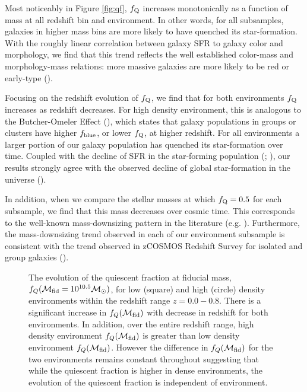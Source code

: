 \documentclass{emulateapj}
\begin{document}
Most noticeably in Figure \ref{fig:qf}, $f_{\rm{Q}}$ increases monotonically as a function of mass at all redshift bin and environment. In other words, for all subsamples, galaxies in higher mass bins are more likely to have quenched its star-formation. With the roughly linear correlation between galaxy SFR to galaxy color and morphology, we find that this trend reflects the well established color-mass and morphology-mass relations: more massive galaxies are more likely to be red or early-type (\cite{blanton09a}). 

Focusing on the redshift evolution of $f_{\rm{Q}}$, we find that for both environments $f_{\rm{Q}}$ increases as redshift decreases. For high density environment, this is analogous to the Butcher-Omeler Effect (\cite{Butcher:1984aa}), which states that galaxy populations in groups or clusters have higher $f_{\rm{blue}}$, or lower $f_{\rm{Q}}$, at higher redshift. For all environments a larger portion of our galaxy population has quenched its star-formation over time. Coupled with the decline of SFR in the star-forming population (\cite{Noeske:2007aa}; \cite{cooper08a}), our results strongly agree with the observed decline of global star-formation in the universe (\cite{hopkins06a}). %

In addition, when we compare the stellar masses at which $f_{\rm{Q}} = 0.5$ for each subsample, we find that this mass decreases over cosmic time. This corresponds to the well-known mass-downsizing pattern in the literature (e.g. \cite{bundy06a}). Furthermore, the mass-downsizing trend observed in each of our environment subsample is consistent with the trend observed in zCOSMOS Redshift Survey for isolated and group galaxies (\cite{Iovino:2010aa}). %

\begin{figure}
    \begin{center}
        \leavevmode
        \caption{The evolution of the quiescent fraction at fiducial mass, $f_{Q}(\mathcal{M}_{\rm{fid}} = 10^{10.5} \mathcal{M}_\odot)$, for low (square) and high (circle) density environments within the redshift range $z = 0.0 - 0.8$.  There is a significant increase in $f_{Q}(\mathcal{M}_{\rm{fid}})$ with decrease in redshift for both environments. In addition, over the entire redshift range, high density environment $f_{Q}(\mathcal{M}_{\rm{fid}})$ is greater than low density environment $f_{Q}(\mathcal{M}_{\rm{fid}})$. However the difference in $f_{Q}(\mathcal{M}_{\rm{fid}})$ for the two environments remains constant throughout suggesting that while the quiescent fraction is higher in dense environments, the evolution of the quiescent fraction is independent of environment.}         \label{fig:qffit}
    \end{center}
\end{figure}
\end{document}
